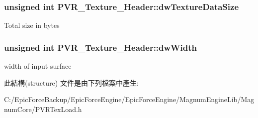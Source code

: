 \subsubsection[{\texorpdfstring{dw\+Texture\+Data\+Size}{dwTextureDataSize}}]{\setlength{\rightskip}{0pt plus 5cm}unsigned int P\+V\+R\+\_\+\+Texture\+\_\+\+Header\+::dw\+Texture\+Data\+Size}\hypertarget{struct_p_v_r___texture___header_ad2a7eea61233461d085191891734177f}{}\label{struct_p_v_r___texture___header_ad2a7eea61233461d085191891734177f}
Total size in bytes 
\subsubsection[{\texorpdfstring{dw\+Width}{dwWidth}}]{\setlength{\rightskip}{0pt plus 5cm}unsigned int P\+V\+R\+\_\+\+Texture\+\_\+\+Header\+::dw\+Width}\hypertarget{struct_p_v_r___texture___header_a35506d49c7fb8fe89cf2d35ec1727bdd}{}\label{struct_p_v_r___texture___header_a35506d49c7fb8fe89cf2d35ec1727bdd}
width of input surface 

此結構(structure) 文件是由下列檔案中產生\+:\begin{DoxyCompactItemize}
\item 
C\+:/\+Epic\+Force\+Backup/\+Epic\+Force\+Engine/\+Epic\+Force\+Engine/\+Magnum\+Engine\+Lib/\+Magnum\+Core/P\+V\+R\+Tex\+Load.\+h\end{DoxyCompactItemize}

